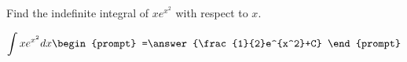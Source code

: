 \documentclass{ximera}
\author{Gregory Hartman \and Matthew Carr}
\begin{document}
\begin{exercise}

Find the indefinite integral of $xe^{x^2}$ with respect to $x$.

\[
\int xe^{x^2} dx
\begin{prompt}
=\answer{\frac{1}{2}e^{x^2}+C}
\end{prompt}
\]


\end{exercise}
\end{document}
